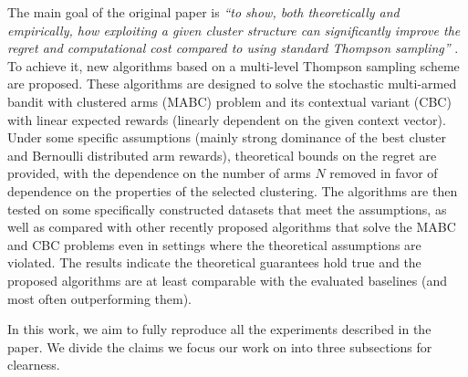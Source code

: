 The main goal of the original paper is \emph{``to show, both theoretically and empirically, how exploiting a given cluster structure can significantly improve the regret and computational cost compared to using standard Thompson sampling''} \cite{bandits}. To achieve it, new algorithms based on a multi-level Thompson sampling scheme \cite{thompson} are proposed. These algorithms are designed to solve the stochastic multi-armed bandit with clustered arms (MABC) problem and its contextual variant (CBC) with linear expected rewards (linearly dependent on the given context vector). Under some specific assumptions (mainly strong dominance of the best cluster and Bernoulli distributed arm rewards), theoretical bounds on the regret are provided, with the dependence on the number of arms $N$ removed in favor of dependence on the properties of the selected clustering. The algorithms are then tested on some specifically constructed datasets that meet the assumptions, as well as compared with other recently proposed algorithms that solve the MABC and CBC problems even in settings where the theoretical assumptions are violated. The results indicate the theoretical guarantees hold true and the proposed algorithms are at least comparable with the evaluated baselines (and most often outperforming them).

In this work, we aim to fully reproduce all the experiments described in the paper. We divide the claims we focus our work on into three subsections for clearness.

